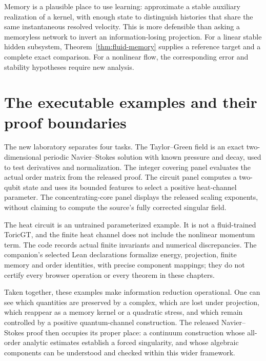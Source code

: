 Memory is a plausible place to use learning: approximate a stable auxiliary realization of a kernel, with enough state to distinguish histories that share the same instantaneous resolved velocity. This is more defensible than asking a memoryless network to invert an information-losing projection. For a linear stable hidden subsystem, Theorem~\ref{thm:fluid-memory} supplies a reference target and a complete exact comparison. For a nonlinear flow, the corresponding error and stability hypotheses require new analysis.

\section{The executable examples and their proof boundaries}

The new laboratory separates four tasks. The Taylor--Green field is an exact two-dimensional periodic Navier--Stokes solution with known pressure and decay, used to test derivatives and normalization. The integer covering panel evaluates the actual order matrix from the released proof. The circuit panel computes a two-qubit state and uses its bounded features to select a positive heat-channel parameter. The concentrating-core panel displays the released scaling exponents, without claiming to compute the source's fully corrected singular field.

The heat circuit is an untrained parameterized example. It is not a fluid-trained ToricGT, and the finite heat channel does not include the nonlinear momentum term. The code records actual finite invariants and numerical discrepancies. The companion's selected Lean declarations formalize energy, projection, finite memory and order identities, with precise component mappings; they do not certify every browser operation or every theorem in these chapters.

Taken together, these examples make information reduction operational. One can see which quantities are preserved by a complex, which are lost under projection, which reappear as a memory kernel or a quadratic stress, and which remain controlled by a positive quantum-channel construction. The released Navier--Stokes proof then occupies its proper place: a continuum construction whose all-order analytic estimates establish a forced singularity, and whose algebraic components can be understood and checked within this wider framework.
